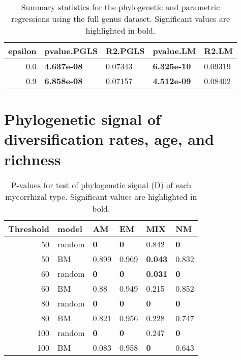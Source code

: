 \documentclass[]{article}
\begin{document}
\begin{table}[H]

\caption{\label{tab:unnamed-chunk-35}Summary statistics for the phylogenetic and parametric regressions using the full genus dataset. Significant values are highlighted in bold.}
\centering
\begin{tabular}{r|l|l|l|l}
\hline
epsilon & pvalue.PGLS & R2.PGLS & pvalue.LM & R2.LM\\
\hline
0.0 & \textbf{4.637e-08} & 0.07343 & \textbf{6.325e-10} & 0.09319\\
\hline
0.9 & \textbf{6.858e-08} & 0.07157 & \textbf{4.512e-09} & 0.08402\\
\hline
\end{tabular}
\end{table}

\hypertarget{phylogenetic-signal-of-diversification-rates-age-and-richness}{%
\section{Phylogenetic signal of diversification rates, age, and
richness}\label{phylogenetic-signal-of-diversification-rates-age-and-richness}}

\begin{table}[H]

\caption{\label{tab:unnamed-chunk-37}P-values for test of phylogenetic signal (D) of each mycorrhizal type. Significant values are highlighted in bold.}
\centering
\begin{tabular}{r|l|l|l|l|l}
\hline
Threshold & model & AM & EM & MIX & NM\\
\hline
50 & random & \textbf{0} & \textbf{0} & 0.842 & \textbf{0}\\
\hline
50 & BM & 0.899 & 0.969 & \textbf{0.043} & 0.832\\
\hline
60 & random & \textbf{0} & \textbf{0} & \textbf{0.031} & \textbf{0}\\
\hline
60 & BM & 0.88 & 0.949 & 0.215 & 0.852\\
\hline
80 & random & \textbf{0} & \textbf{0} & \textbf{0} & \textbf{0}\\
\hline
80 & BM & 0.821 & 0.956 & 0.228 & 0.747\\
\hline
100 & random & \textbf{0} & \textbf{0} & 0.247 & \textbf{0}\\
\hline
100 & BM & 0.083 & 0.958 & \textbf{0} & 0.643\\
\hline
\end{tabular}
\end{table}
\end{document}
